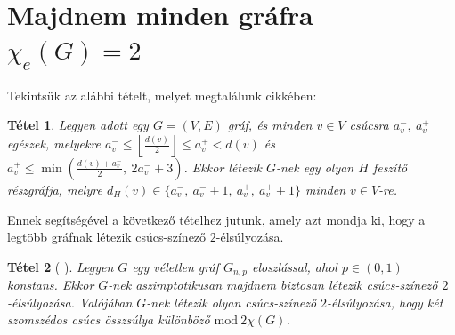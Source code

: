 \documentclass[12pt, a4paper]{report}
\newtheorem{tét}{Tétel}[section]
\theoremstyle{remark}
\theoremstyle{definition}
\begin{document}
\section{Majdnem minden gráfra $χ_e(G) = 2$}
Tekintsük az alábbi tételt, melyet megtalálunk \citeauthor{AddarioBerry2008} \cite{AddarioBerry2008} cikkében:

\begin{tét} \label{thm:degreeconstgeneric}
Legyen adott egy $G = (V, E)$ gráf, és minden $v \in V$ csúcsra $a_v^-,\ a_v^+$ egészek, melyekre $a_v^- \leq \left\lfloor \frac{d(v)}{2} \right\rfloor \leq a_v^+ < d(v)$ és $a_v^+ \leq \min \left(\frac{d(v) + a_v^-}{2},\ 2a_v^- + 3 \right)$. Ekkor létezik $G$-nek egy olyan $H$ feszítő részgráfja, melyre $d_H(v) \in \lbrace a_v^-,\ a_v^- + 1,\ a_v^+,\ a_v^+ + 1 \rbrace$ minden $v \in V$-re.
\end{tét}

Ennek segítségével a következő tételhez jutunk, amely azt mondja ki, hogy a legtöbb gráfnak létezik csúcs-színező $2$-élsúlyozása.

\begin{tét} [\citeauthor{AddarioBerry2008} \cite{AddarioBerry2008}]
Legyen $G$ egy véletlen gráf $G_{n,p}$ eloszlással, ahol $p \in (0, 1)$ konstans. Ekkor $G$-nek aszimptotikusan majdnem biztosan létezik csúcs-színező $2$-élsúlyozása. Valójában $G$-nek létezik olyan csúcs-színező $2$-élsúlyozása, hogy két szomszédos csúcs összsúlya különböző $\mathrm{mod}\ 2\chi(G)$.
\end{tét}
\end{document}
